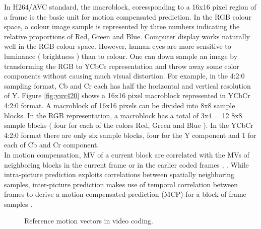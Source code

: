 	In H264/AVC standard, the macroblock, coressponding to a 16x16 pixel region of a frame is the basic unit for motion compensated prediction. In the RGB colour space, a colour image sample is represented by three numbers indicating the relative proportions of Red, Green and Blue. Computer display works naturally well in the RGB colour space. However, human eyes are more sensitive to luminance ( brightness ) than to colour. One can down sample an image by transforming the RGB to YCbCr representation and throw away some color components without causing much visual distortion. For example, in the 4:2:0 sampling format, Cb and Cr each has half the horizontal and vertical resolution of Y. Figure \ref{fig:yuv420} shows a 16x16 pixel macroblock represented in YCbCr 4:2:0 format. A macroblock of 16x16 pixels can be divided into 8x8 sample blocks. In the RGB representation, a macroblock has a total of 3x4 = 12 8x8 sample blocks ( four for each of the colors Red, Green and Blue ). In the YCbCr 4:2:0 format there are only six sample blocks, four for the Y component and 1 for each of Cb and Cr component.\\
  In  motion compensation, MV of a current block are correlated with the MVs of neighboring blocks in the current frame or in the earlier coded frames \cite{laroche2008rd}, \cite{jiang2019spatial}. While intra-picture prediction exploits correlations between spatially neighboring samples, inter-picture prediction makes use of temporal correlation between frames to derive a motion-compensated prediction (MCP) for a block of frame samples \cite{bross2014inter}.
\begin{figure}
\centering
{}
 \caption{ Reference motion vectors in video coding.}
 \label{fig:mv}
\end{figure}
